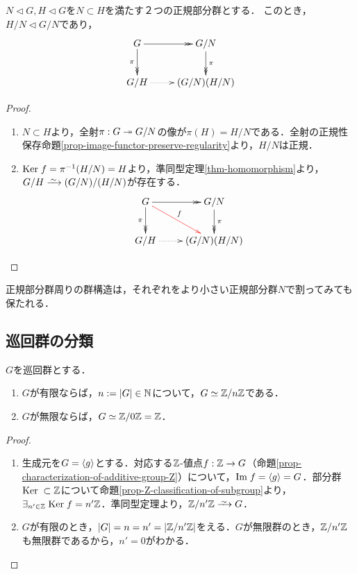 \documentclass[uplatex,dvipdfmx]{jsreport}
\begin{document}
\begin{corollary}[第三同型定理]
    $N\triangleleft G,H\triangleleft G$を$N\subset H$を満たす２つの正規部分群とする．
    このとき，$H/N\triangleleft G/N$であり，
    \[\xymatrix{
        G\ar@{->>}[d]_-{\pi}\ar@{->>}[r]&G/N\ar@{->>}[d]^-{\pi}\\
        G/H\ar@{.>}[r]&(G/N)(H/N)
    }\]
\end{corollary}
\begin{proof}\mbox{}
    \begin{enumerate}
        \item $N\subset H$より，全射$\pi:G\twoheadrightarrow G/N$の像が$\pi(H)=H/N$である．全射の正規性保存命題\ref{prop-image-functor-preserve-regularity}より，$H/N$は正規．
        \item $\mathrm{Ker}\; f=\pi^{-1}(H/N)=H$より，準同型定理\ref{thm-homomorphism}より，$G/H\iso(G/N)/(H/N)$が存在する．
        \[\xymatrix{
            G\ar@{->>}[d]_-{\pi}\ar@{->>}[r]\ar@[red][dr]^-f&G/N\ar@{->>}[d]^-{\pi}\\
            G/H\ar@{.>}[r]&(G/N)(H/N)
        }\]
    \end{enumerate}
\end{proof}
\begin{remarks}
    正規部分群周りの群構造は，それぞれをより小さい正規部分群$N$で割ってみても保たれる．
\end{remarks}

\subsection{巡回群の分類}

\begin{theorem}\label{thm-classification-of-cyclic-groups}
    $G$を巡回群とする．
    \begin{enumerate}
        \item $G$が有限ならば，$n:=\lvert G\rvert\in\mathbb{N}$について，$G\simeq\mathbb{Z}/n\mathbb{Z}$である．
        \item $G$が無限ならば，$G\simeq\mathbb{Z}/0\mathbb{Z}=\mathbb{Z}$．
    \end{enumerate}
\end{theorem}
\begin{proof}\mbox{}
    \begin{enumerate}
        \item 生成元を$G=\langle g\rangle$とする．対応する$\mathbb{Z}$-値点$f:\mathbb{Z}\to G$（命題\ref{prop-characterization-of-additive-group-Z}）について，$\mathrm{Im}\; f=\langle g\rangle=G$．部分群$\mathrm{Ker}\;\subset\mathbb{Z}$について命題\ref{prop-Z-classification-of-subgroup}より，$\exists_{n'\in\mathbb{Z}}\;\mathrm{Ker}\; f=n'\mathbb{Z}$．準同型定理より，$\Z/n'\Z\iso G$．
        \item $G$が有限のとき，$\lvert G\rvert=n=n'=\lvert\mathbb{Z}/n'\mathbb{Z}\rvert$をえる．$G$が無限群のとき，$\mathbb{Z}/n'\mathbb{Z}$も無限群であるから，$n'=0$がわかる．
    \end{enumerate}
\end{proof}
\end{document}
